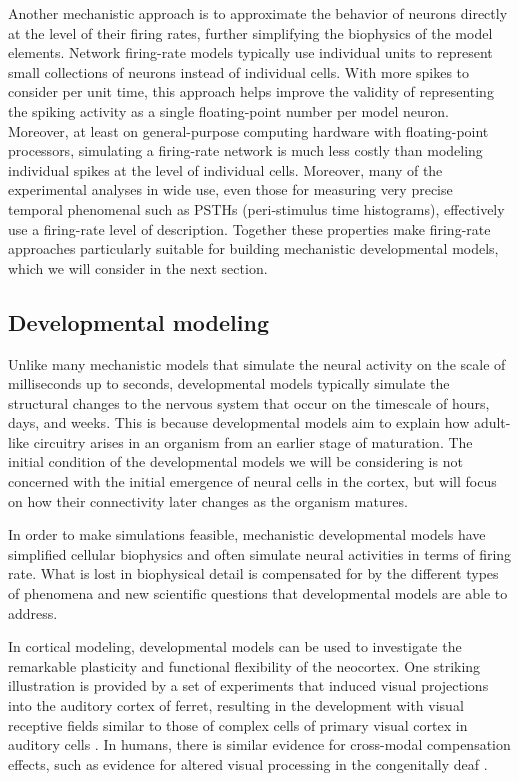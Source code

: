 \documentclass[phd,ianc,twoside]{infthesis}
\begin{document}
Another mechanistic approach is to approximate the behavior of neurons
directly at the level of their firing rates, further simplifying the
biophysics of the model elements. Network firing-rate models typically
use individual units to represent small collections of neurons instead
of individual cells. With more spikes to consider per unit time, this
approach helps improve the validity of representing the spiking
activity as a single floating-point number per model neuron.
Moreover, at least on general-purpose computing hardware with
floating-point processors, simulating a firing-rate network is much
less costly than modeling individual spikes at the level of individual
cells.  Moreover, many of the experimental analyses in wide use, even
those for measuring very precise temporal phenomenal such as PSTHs
(peri-stimulus time histograms), effectively use a firing-rate level
of description.  Together these properties make firing-rate approaches
particularly suitable for building mechanistic developmental models,
which we will consider in the next section.

\subsection{Developmental modeling}
\label{section:developmental_modeling}

Unlike many mechanistic models that simulate the neural activity on the scale
of milliseconds up to seconds, developmental models typically simulate the
structural changes to the nervous system that occur on the timescale of
hours, days, and weeks. This is because developmental models aim to explain how
adult-like circuitry arises in an organism from an earlier stage of
maturation. The initial condition of the developmental models we will be
considering is not concerned with the initial emergence of neural cells in
the cortex, but will focus on how their connectivity later changes as the
organism matures.

In order to make simulations feasible, mechanistic developmental models
have simplified cellular biophysics and often simulate neural activities
in terms of firing rate. What is lost in biophysical detail is
compensated for by the different types of phenomena and new scientific
questions that developmental models are able to address.

In cortical modeling, developmental models can be used to investigate
the remarkable plasticity and functional flexibility of the
neocortex. One striking illustration is provided by a set of experiments
that induced visual projections into the auditory cortex of ferret,
resulting in the development with visual receptive fields similar to
those of complex cells of primary visual cortex in auditory cells
\citep{sur_science88,roe_jn92}. In humans, there is similar evidence for
cross-modal compensation effects, such as evidence for altered visual
processing in the congenitally deaf \citep{karns_jn12}.
\end{document}
